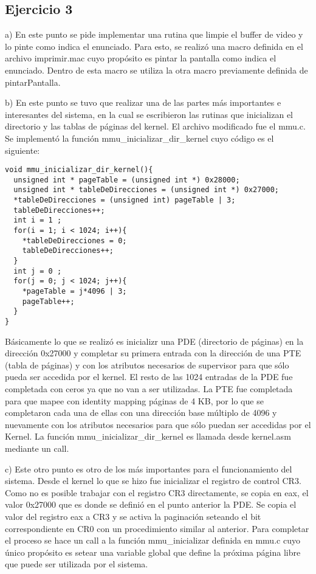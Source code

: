 \documentclass[a4paper]{article}
\begin{document}
\subsection{Ejercicio 3}

a) En este punto se pide implementar una rutina que limpie el buffer de video y lo pinte como indica el enunciado. Para esto, se realizó una macro definida en el archivo imprimir.mac cuyo propósito es pintar la pantalla como indica el enunciado. Dentro de esta macro se utiliza la otra macro previamente definida de pintarPantalla.

b) En este punto se tuvo que realizar una de las partes más importantes e interesantes del sistema, en la cual se escribieron las rutinas que inicializan el directorio y las tablas de páginas del kernel. El archivo modificado fue el mmu.c. Se implementó la función mmu_inicializar_dir_kernel cuyo código es el siguiente: 

\begin{verbatim}
void mmu_inicializar_dir_kernel(){
  unsigned int * pageTable = (unsigned int *) 0x28000;
  unsigned int * tableDeDirecciones = (unsigned int *) 0x27000;
  *tableDeDirecciones = (unsigned int) pageTable | 3;
  tableDeDirecciones++;
  int i = 1 ;
  for(i = 1; i < 1024; i++){
    *tableDeDirecciones = 0;
    tableDeDirecciones++;
  }
  int j = 0 ;
  for(j = 0; j < 1024; j++){
    *pageTable = j*4096 | 3;
    pageTable++;
  }
}
\end{verbatim}

Básicamente lo que se realizó es inicializr una PDE (directorio de páginas) en la dirección 0x27000 y completar su primera entrada con la dirección de una PTE (tabla de páginas) y con los atributos necesarios de supervisor para que sólo pueda ser accedida por el kernel. El resto de las 1024 entradas de la PDE fue completada con ceros ya que no van a ser utilizadas. La PTE fue completada para que mapee con identity mapping páginas de 4 KB, por lo que se completaron cada una de ellas con una dirección base múltiplo de 4096 y nuevamente con los atributos necesarios para que sólo puedan ser accedidas por el Kernel.
La función mmu_inicializar_dir_kernel es llamada desde kernel.asm mediante un call.

c) Este otro punto es otro de los más importantes para el funcionamiento del sistema. Desde el kernel lo que se hizo fue inicializar el registro de control CR3. Como no es posible trabajar con el registro CR3 directamente, se copia en eax, el valor 0x27000 que es donde se definió en el punto anterior la PDE. Se copia el valor del registro eax a CR3 y se activa la paginación seteando el bit correspondiente en CR0 con un procedimiento similar al anterior. Para completar el proceso se hace un call a la función mmu_inicializar definida en mmu.c cuyo único propósito es setear una variable global que define la próxima página libre que puede ser utilizada por el sistema.
\end{document}
